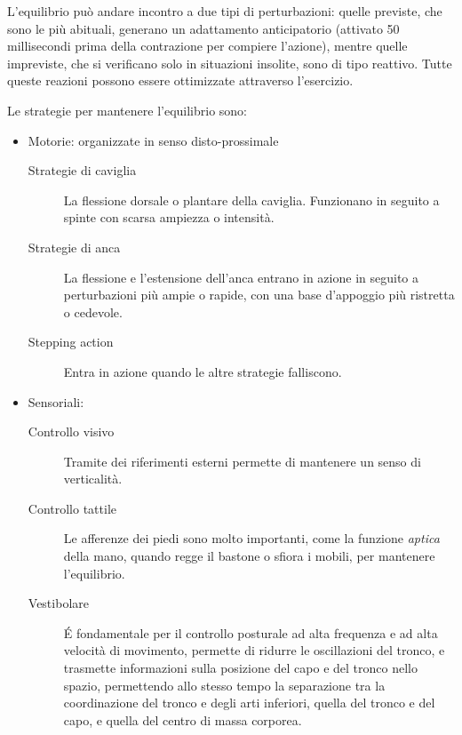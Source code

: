 L'equilibrio può andare incontro a due tipi di perturbazioni: quelle previste,
che sono le più abituali, generano un adattamento anticipatorio (attivato 50
millisecondi prima della contrazione per compiere l'azione), mentre quelle
impreviste, che si verificano solo in situazioni insolite, sono di tipo
reattivo. Tutte queste reazioni possono essere ottimizzate attraverso
l'esercizio.

Le strategie per mantenere l'equilibrio sono:
\begin{itemize}
\item Motorie: organizzate in senso disto-prossimale
	\begin{description}
	\item[Strategie di caviglia] La flessione dorsale o plantare della caviglia.
	Funzionano in seguito a spinte con scarsa ampiezza o intensità.
	\item[Strategie di anca] La flessione e l'estensione dell'anca entrano in azione
	in seguito a perturbazioni più ampie o rapide, con una base d'appoggio più
	ristretta o cedevole.
	\item[Stepping action] Entra in azione quando le altre strategie falliscono.
	\end{description}
\item Sensoriali:
	\begin{description}
	\item[Controllo visivo] Tramite dei riferimenti esterni permette di mantenere
	un senso di verticalità.
	\item[Controllo tattile] Le afferenze dei piedi sono molto importanti, come la
	funzione \textit{aptica} della mano, quando regge il bastone o sfiora i mobili,
	per mantenere l'equilibrio.
	\item[Vestibolare] \'E fondamentale per il controllo posturale ad alta
	frequenza e ad alta velocità di movimento, permette di ridurre le oscillazioni
	del tronco, e trasmette informazioni sulla posizione del capo e del tronco
	nello spazio, permettendo allo stesso tempo la separazione tra la coordinazione
	del tronco e degli arti inferiori, quella del tronco e del capo, e quella del
	centro di massa corporea.
	\end{description}
\end{itemize}

